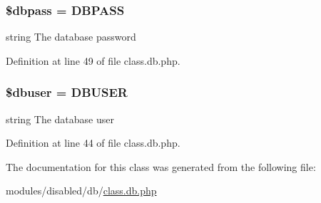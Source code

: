\hypertarget{class_d_b_a95e283b6dd5867f7b99c160bebf9826c}{
\subsubsection[{\$dbpass}]{\setlength{\rightskip}{0pt plus 5cm}\$dbpass = {\bf D\-B\-P\-A\-S\-S}\hspace{0.3cm}{\ttfamily [static]}}}\label{class_d_b_a95e283b6dd5867f7b99c160bebf9826c}
string The database password 

Definition at line 49 of file class.\-db.\-php.

\hypertarget{class_d_b_a8d5ac1c3396a540f025f9bbe56a5b568}{
\subsubsection[{\$dbuser}]{\setlength{\rightskip}{0pt plus 5cm}\$dbuser = {\bf D\-B\-U\-S\-E\-R}\hspace{0.3cm}{\ttfamily [static]}}}\label{class_d_b_a8d5ac1c3396a540f025f9bbe56a5b568}
string The database user 

Definition at line 44 of file class.\-db.\-php.



The documentation for this class was generated from the following file\-:\begin{DoxyCompactItemize}
\item 
modules/disabled/db/\hyperlink{class_8db_8php}{class.\-db.\-php}\end{DoxyCompactItemize}
